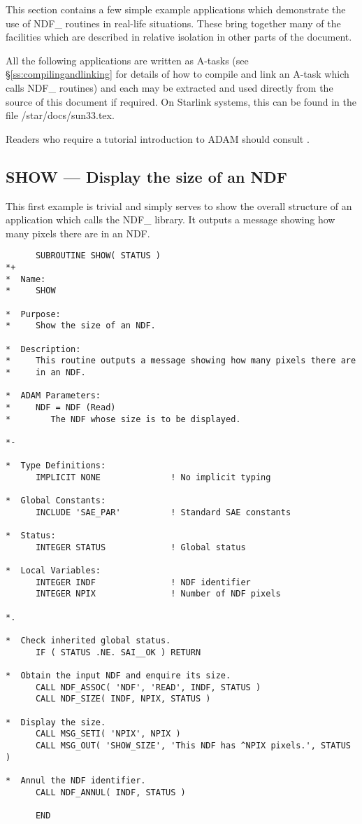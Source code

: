 This section contains a few simple example applications which demonstrate the
use of NDF\_ routines in real-life situations. These bring together many of the
facilities which are described in relative isolation in other parts of the
document.

All the following applications are written as 
A-tasks (see \S\ref{ss:compilingandlinking} for details of how to
compile and link an A-task which calls NDF\_ routines) and each may be
extracted and used directly from the source of this document if
required. On Starlink systems, this can be found in the file
/star/docs/sun33.tex.

Readers who require a tutorial introduction to ADAM should consult
.

\subsection{SHOW --- Display the size of an NDF}

This first example is trivial and simply serves to show the overall
structure of an  application which calls the NDF\_
library. It
outputs a message showing how many pixels there are in an NDF.

\small
\begin{verbatim}
      SUBROUTINE SHOW( STATUS )
*+
*  Name:
*     SHOW

*  Purpose:
*     Show the size of an NDF.

*  Description:
*     This routine outputs a message showing how many pixels there are
*     in an NDF.

*  ADAM Parameters:
*     NDF = NDF (Read)
*        The NDF whose size is to be displayed.

*-
      
*  Type Definitions:
      IMPLICIT NONE              ! No implicit typing

*  Global Constants:
      INCLUDE 'SAE_PAR'          ! Standard SAE constants

*  Status:
      INTEGER STATUS             ! Global status

*  Local Variables:
      INTEGER INDF               ! NDF identifier
      INTEGER NPIX               ! Number of NDF pixels

*.

*  Check inherited global status.
      IF ( STATUS .NE. SAI__OK ) RETURN

*  Obtain the input NDF and enquire its size.
      CALL NDF_ASSOC( 'NDF', 'READ', INDF, STATUS )
      CALL NDF_SIZE( INDF, NPIX, STATUS )

*  Display the size.
      CALL MSG_SETI( 'NPIX', NPIX )
      CALL MSG_OUT( 'SHOW_SIZE', 'This NDF has ^NPIX pixels.', STATUS )

*  Annul the NDF identifier.
      CALL NDF_ANNUL( INDF, STATUS )

      END
\end{verbatim}
\normalsize

